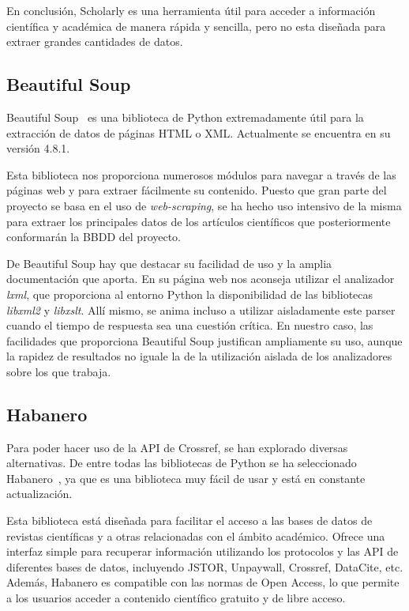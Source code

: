 En conclusión, Scholarly es una herramienta útil para acceder a información científica y académica de manera rápida y sencilla, pero no esta diseñada para extraer grandes cantidades de datos.

\subsection{Beautiful Soup}
Beautiful Soup~\cite{bs4} es una biblioteca de Python extremadamente útil para la extracción de datos de páginas HTML o XML. Actualmente se encuentra en su versión 4.8.1.

Esta biblioteca nos proporciona numerosos módulos para navegar a través de las páginas web y para extraer fácilmente su contenido. Puesto que gran parte del proyecto se basa en el uso de \textit{web-scraping}, se ha hecho uso intensivo de la misma para extraer los principales datos de los artículos científicos que posteriormente conformarán la BBDD del proyecto.

De Beautiful Soup hay que destacar su facilidad de uso y la amplia documentación que aporta. En su página web nos aconseja utilizar el analizador \textit{lxml}, que proporciona al entorno Python la disponibilidad de las bibliotecas \textit{libxml2} y \textit{libxslt}. Allí mismo, se anima incluso a utilizar aisladamente este parser cuando el tiempo de respuesta sea una cuestión crítica. En nuestro caso, las facilidades que proporciona Beautiful Soup justifican ampliamente su uso, aunque la  rapidez de resultados no iguale la de la utilización aislada de los analizadores sobre los que trabaja.
 

\subsection{Habanero}
Para poder hacer uso de la API de Crossref, se han explorado diversas alternativas. De entre todas las bibliotecas de Python se ha seleccionado Habanero~\cite{habanero}, ya que es una biblioteca muy fácil de usar y está en constante actualización.

Esta biblioteca está diseñada para facilitar el acceso a las bases de datos de revistas científicas y a otras relacionadas con el ámbito académico. Ofrece una interfaz simple para recuperar información utilizando los protocolos y las API de diferentes bases de datos, incluyendo JSTOR, Unpaywall, Crossref, DataCite, etc. Además, Habanero es compatible con las normas de Open Access, lo que permite a los usuarios acceder a contenido científico gratuito y de libre acceso.

